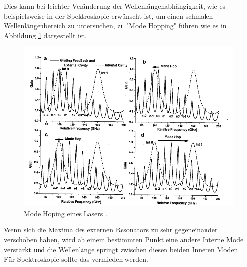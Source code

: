 Dies kann bei leichter Veränderung der Wellenlängenabhängigkeit, wie es beispielsweise in der Spektroskopie erwünscht ist, um einen schmalen 
Wellenlängenbereich zu untersuchen, zu "Mode Hopping"  führen wie es in Abbildung \ref{fig:Moden2} dargestellt ist.
\begin{figure}[H]
    \centering
    \includegraphics[scale=0.8]{pictures/Moden2.png}
    \caption{Mode Hoping eines Lasers \cite{teachspin}.}
    \label{fig:Moden2}
\end{figure}
\noindent Wenn sich die Maxima des externen Resonators zu sehr gegeneinander verschoben haben, wird ab einem bestimmten Punkt eine andere Interne Mode verstärkt und 
die Wellenlänge springt zwischen diesen beiden Inneren Moden. Für Spektroskopie sollte das vermieden werden.
